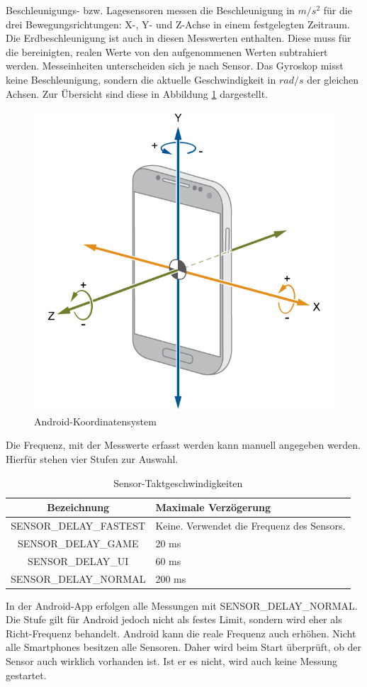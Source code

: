 \documentclass[11pt,a4paper]{report}
\begin{document}
Beschleunigungs- bzw. Lagesensoren messen die Beschleunigung in $m/s^2$ für die drei Bewegungsrichtungen: X-, Y- und Z-Achse in einem festgelegten Zeitraum.
Die Erdbeschleunigung ist auch in diesen Messwerten enthalten.
Diese muss für die bereinigten, realen Werte von den aufgenommenen Werten subtrahiert werden\cite{accel_g}.
Messeinheiten unterscheiden sich je nach Sensor.
Das Gyroskop misst keine Beschleunigung, sondern die aktuelle Geschwindigkeit in $rad/s$ der gleichen Achsen.
Zur Übersicht sind diese in Abbildung \ref{fig:and_axes} dargestellt.
\begin{figure}[htbp]
  \centering
  \includegraphics[width=.7\textwidth]{images/android_axes.png}
  \caption{Android-Koordinatensystem}
  \label{fig:and_axes}
\end{figure}
Die Frequenz, mit der Messwerte erfasst werden kann manuell angegeben werden.
Hierfür stehen vier Stufen zur Auswahl.
\begin{table}[htbp]
  \centering
  \begin{tabular}{|c|p{4cm}|}
      \hline
      \textbf{Bezeichnung} & \textbf{Maximale Verzögerung} \\
	  \hline
      SENSOR\_DELAY\_FASTEST & Keine. Verwendet die Frequenz des Sensors.\\
      \hline
      SENSOR\_DELAY\_GAME & 20 ms\\
      \hline
      SENSOR\_DELAY\_UI & 60 ms\\
      \hline
      SENSOR\_DELAY\_NORMAL & 200 ms\\
      \hline
  \end{tabular}
  \caption{Sensor-Taktgeschwindigkeiten\cite{sensor-takt}}
  \label{tab:sensor_speeds}
\end{table}
In der Android-App erfolgen alle Messungen mit SENSOR\_DELAY\_NORMAL.
Die Stufe gilt für Android jedoch nicht als festes Limit, sondern wird eher als Richt-Frequenz behandelt.
Android kann die reale Frequenz auch erhöhen.
Nicht alle Smartphones besitzen alle Sensoren.
Daher wird beim Start überprüft, ob der Sensor auch wirklich vorhanden ist.
Ist er es nicht, wird auch keine Messung gestartet.
\end{document}
